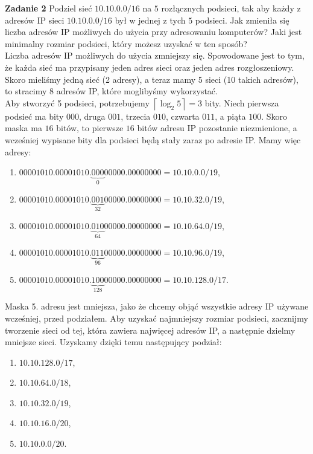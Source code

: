 \documentclass[a4paper,12pt]{article}
\newcommand{\ceil}[1]{\left\lceil #1 \right\rceil}		%
\begin{document}
\noindent \newline \textbf{Zadanie 2} \newline
Podziel sieć $10.10.0.0/16$ na $5$ rozłącznych podsieci, tak aby każdy z adresów
IP sieci $10.10.0.0/16$ był w jednej z tych $5$ podsieci. Jak zmieniła się liczba
adresów IP możliwych do użycia przy adresowaniu komputerów? Jaki jest minimalny
rozmiar podsieci, który możesz uzyskać w ten sposób? \\

\noindent Liczba adresów IP możliwych do użycia zmniejszy się. Spowodowane jest
to tym, że każda sieć ma przypisany jeden adres sieci oraz jeden adres 
rozgłoszeniowy. Skoro mieliśmy jedną sieć (2 adresy), a teraz mamy 5 sieci
(10 takich adresów), to stracimy 8 adresów IP, które moglibyśmy wykorzystać. \\

\noindent Aby stworzyć 5 podsieci, potrzebujemy $\ceil{\log_2{5}} = 3$ bity.
Niech pierwsza podsieć ma bity $000$, druga $001$, trzecia $010$, czwarta $011$,
a piąta $100$. Skoro maska ma $16$ bitów, to pierwsze $16$ bitów adresu IP
pozostanie niezmienione, a wcześniej wypisane bity dla podsieci będą stały zaraz
po adresie IP. Mamy więc adresy:

\begin{enumerate}
    \item $00001010.00001010.\underbrace{000}_{0}00000.00000000 = 10.10.0.0/19$,
    \item $00001010.00001010.\underbrace{001}_{32}00000.00000000 = 10.10.32.0/19$,
    \item $00001010.00001010.\underbrace{010}_{64}00000.00000000 = 10.10.64.0/19$,
    \item $00001010.00001010.\underbrace{011}_{96}00000.00000000 = 10.10.96.0/19$,
    \item $00001010.00001010.\underbrace{100}_{128}00000.00000000 = 10.10.128.0/17$.
\end{enumerate}

\noindent Maska 5. adresu jest mniejsza, jako że chcemy objąć wszystkie adresy
IP używane wcześniej, przed podziałem. Aby uzyskać najmniejszy rozmiar podsieci,
zacznijmy tworzenie sieci od tej, która zawiera najwięcej adresów IP, a następnie
dzielmy mniejsze sieci. Uzyskamy dzięki temu następujący podział:

\begin{enumerate}
    \item $10.10.128.0/17$,
    \item $10.10.64.0/18$,
    \item $10.10.32.0/19$,
    \item $10.10.16.0/20$,
    \item $10.10.0.0/20$.
\end{enumerate}
\end{document}
